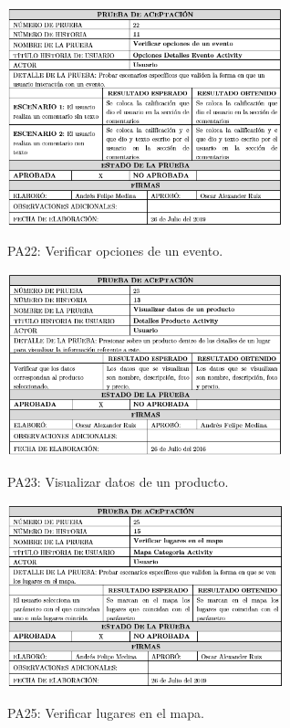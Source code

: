 \documentclass[12pt,letterpaper,openany]{book}
\begin{document}
\begin{table}[H]
\centering
\includegraphics[width=8cm]{./imagenes/PA/PA22}
\caption{PA22: Verificar opciones de un evento.}
\end{table}

\begin{table}[H]
\centering
\includegraphics[width=8cm]{./imagenes/PA/PA23}
\caption{PA23: Visualizar datos de un producto.}
\end{table}

\begin{table}[H]
\centering
\includegraphics[width=8cm]{./imagenes/PA/PA25}
\caption{PA25: Verificar lugares en el mapa.}
\end{table}
\end{document}
